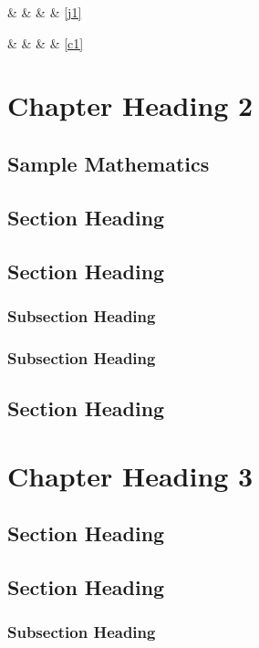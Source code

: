 \documentclass[dissertation,math,vertlayout]{aaltoseries}
\begin{document}
 \&  \&  \& \pageref{j1} \& \ref{j1}

 \&  \&   \& \pageref{c1} \& \ref{c1} 


\chapter{Chapter Heading 2}
\section{Sample Mathematics}

\section{Section Heading}
\lipsum[1-4]
\section{Section Heading}
\lipsum[5-6]
\subsection{Subsection Heading}
\lipsum[7-8]
\subsection{Subsection Heading}
\lipsum[9-10]
\section{Section Heading}
\lipsum[11-12]

\chapter[Short Chapter Heading]{Chapter Heading 3}
\section{Section Heading}
\lipsum[1-4]
\section{Section Heading}
\lipsum[5-6]
\subsection{Subsection Heading}
\lipsum[7-8]
\end{document}

